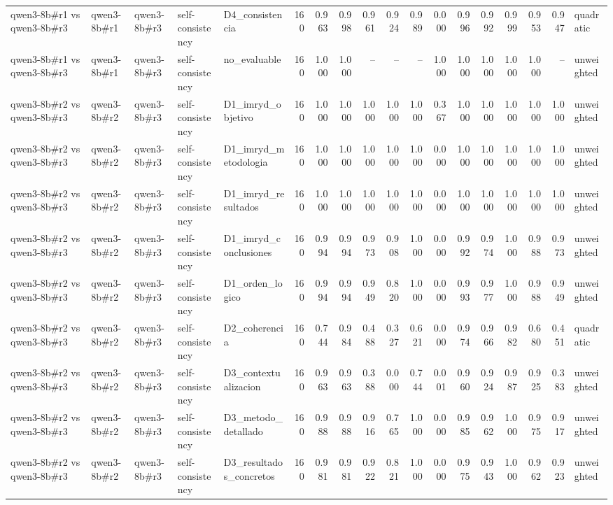 \begin{table}
{\begin{tabular}{lllllrrrrrrrrrrrrl}
qwen3-8b\#r1 vs qwen3-8b\#r3 & qwen3-8b\#r1 & qwen3-8b\#r3 & self-consistency & D4\_consistencia & 160 & 0.963 & 0.998 & 0.961 & 0.924 & 0.989 & 0.000 & 0.996 & 0.992 & 0.999 & 0.953 & 0.947 & quadratic \\
qwen3-8b\#r1 vs qwen3-8b\#r3 & qwen3-8b\#r1 & qwen3-8b\#r3 & self-consistency & no\_evaluable & 160 & 1.000 & 1.000 & -- & -- & -- & 1.000 & 1.000 & 1.000 & 1.000 & 1.000 & -- & unweighted \\
qwen3-8b\#r2 vs qwen3-8b\#r3 & qwen3-8b\#r2 & qwen3-8b\#r3 & self-consistency & D1\_imryd\_objetivo & 160 & 1.000 & 1.000 & 1.000 & 1.000 & 1.000 & 0.367 & 1.000 & 1.000 & 1.000 & 1.000 & 1.000 & unweighted \\
qwen3-8b\#r2 vs qwen3-8b\#r3 & qwen3-8b\#r2 & qwen3-8b\#r3 & self-consistency & D1\_imryd\_metodologia & 160 & 1.000 & 1.000 & 1.000 & 1.000 & 1.000 & 0.000 & 1.000 & 1.000 & 1.000 & 1.000 & 1.000 & unweighted \\
qwen3-8b\#r2 vs qwen3-8b\#r3 & qwen3-8b\#r2 & qwen3-8b\#r3 & self-consistency & D1\_imryd\_resultados & 160 & 1.000 & 1.000 & 1.000 & 1.000 & 1.000 & 0.000 & 1.000 & 1.000 & 1.000 & 1.000 & 1.000 & unweighted \\
qwen3-8b\#r2 vs qwen3-8b\#r3 & qwen3-8b\#r2 & qwen3-8b\#r3 & self-consistency & D1\_imryd\_conclusiones & 160 & 0.994 & 0.994 & 0.973 & 0.908 & 1.000 & 0.000 & 0.992 & 0.974 & 1.000 & 0.988 & 0.973 & unweighted \\
qwen3-8b\#r2 vs qwen3-8b\#r3 & qwen3-8b\#r2 & qwen3-8b\#r3 & self-consistency & D1\_orden\_logico & 160 & 0.994 & 0.994 & 0.949 & 0.820 & 1.000 & 0.000 & 0.993 & 0.977 & 1.000 & 0.988 & 0.949 & unweighted \\
qwen3-8b\#r2 vs qwen3-8b\#r3 & qwen3-8b\#r2 & qwen3-8b\#r3 & self-consistency & D2\_coherencia & 160 & 0.744 & 0.984 & 0.488 & 0.327 & 0.621 & 0.000 & 0.974 & 0.966 & 0.982 & 0.680 & 0.451 & quadratic \\
qwen3-8b\#r2 vs qwen3-8b\#r3 & qwen3-8b\#r2 & qwen3-8b\#r3 & self-consistency & D3\_contextualizacion & 160 & 0.963 & 0.963 & 0.388 & 0.000 & 0.744 & 0.001 & 0.960 & 0.924 & 0.987 & 0.925 & 0.383 & unweighted \\
qwen3-8b\#r2 vs qwen3-8b\#r3 & qwen3-8b\#r2 & qwen3-8b\#r3 & self-consistency & D3\_metodo\_detallado & 160 & 0.988 & 0.988 & 0.916 & 0.765 & 1.000 & 0.000 & 0.985 & 0.962 & 1.000 & 0.975 & 0.917 & unweighted \\
qwen3-8b\#r2 vs qwen3-8b\#r3 & qwen3-8b\#r2 & qwen3-8b\#r3 & self-consistency & D3\_resultados\_concretos & 160 & 0.981 & 0.981 & 0.922 & 0.821 & 1.000 & 0.000 & 0.975 & 0.943 & 1.000 & 0.962 & 0.923 & unweighted \\

\end{tabular}}
\end{table}
